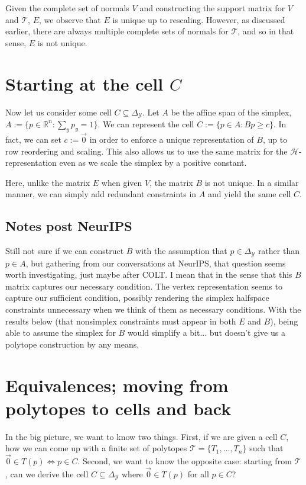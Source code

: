 \documentclass[12pt]{article}
\newcommand{\reals}{\mathbb{R}}
\newcommand{\simplex}{\Delta_\Y}
\renewcommand{\H}{\mathcal{H}}
\newcommand{\T}{\mathcal{T}}
\newcommand{\Y}{\mathcal{Y}}
\begin{document}
  Given the complete set of normals $V$ and constructing the support matrix for $V$ and $\T$, $E$, we observe that $E$ is unique up to rescaling.
  However, as discussed earlier, there are always multiple complete sets of normals for $\T$, and so in that sense, $E$ is not unique.
  

  \section{Starting at the cell $C$}\label{sec:start-cell}
  
  Now let us consider some cell $C \subseteq \simplex$.
  Let $A$ be the affine span of the simplex, $A := \{p \in \reals^n : \sum_y p_y = 1\}$.
  We can represent the cell $C := \{p \in A : Bp \geq c\}$.
  In fact, we can set $c := \vec 0$ in order to enforce a unique representation of $B$, up to row reordering and scaling.
  This also allows us to use the same matrix for the $\H$-representation even as we scale the simplex by a positive constant.
  
  Here, unlike the matrix $E$ when given $V$, the matrix $B$ is not unique.
  In a similar manner, we can simply add redundant constraints in $A$ and yield the same cell $C$.
 
  \subsection{Notes post NeurIPS} 
  Still not sure if we can construct $B$ with the assumption that $p \in \simplex$ rather than $p \in A$, but gathering from our conversations at NeurIPS, that question seems worth investigating, just maybe after COLT.
  I mean that in the sense that this $B$ matrix captures our necessary condition.
  The vertex representation seems to capture our sufficient condition, possibly rendering the simplex halfspace constraints unnecessary when we think of them as necessary conditions.
  With the results below (that nonsimplex constraints must appear in both $E$ and $B$), being able to assume the simplex for $B$ would simplify a bit... but doesn't give us a polytope construction by any means.

  \section{Equivalences; moving from polytopes to cells and back}
  
  In the big picture, we want to know two things.
  First, if we are given a cell $C$, how we can come up with a finite set of polytopes $\T = \{T_1, \ldots, T_n\}$ such that $\vec 0 \in T(p) \iff p \in C$.
  Second, we want to know the opposite case: starting from $\T$, can we derive the cell $C \subseteq \simplex$ where $\vec 0 \in T(p)$ for all $p \in C$?
  
\end{document}

